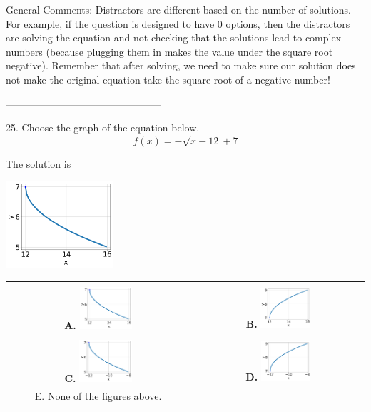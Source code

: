 \documentclass{extbook}[14pt]
\begin{document}
General Comments: Distractors are different based on the number of solutions. For example, if the question is designed to have 0 options, then the distractors are solving the equation and not checking that the solutions lead to complex numbers (because plugging them in makes the value under the square root negative). Remember that after solving, we need to make sure our solution does not make the original equation take the square root of a negative number!

-----------------------------------------------

25. Choose the graph of the equation below.
\[ f(x) = - \sqrt{x - 12} + 7 \] 

 
 The solution is  
 \begin{center} \includegraphics[width=0.3\textwidth]{../Figures/radicalEquationToGraphCB.png} \end{center}\begin{tabular}{|c|c|} 
\hline 
 & \tabularnewline 
 \textbf{A.} \includegraphics[width=0.3\textwidth]{../Figures/radicalEquationToGraphCB.png} & \textbf{B.} \includegraphics[width=0.3\textwidth]{../Figures/radicalEquationToGraphBB.png} \tabularnewline 
\hline 
 & \tabularnewline 
 \textbf{C.} \includegraphics[width=0.3\textwidth]{../Figures/radicalEquationToGraphDB.png} & \textbf{D.} \includegraphics[width=0.3\textwidth]{../Figures/radicalEquationToGraphAB.png} \tabularnewline 
\hline 
 E. None of the figures above. & \tabularnewline 
\hline 
 \end{tabular} 
 
\end{document}
